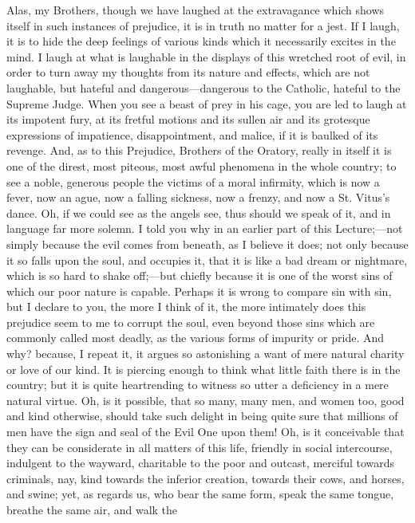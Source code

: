 Alas, my Brothers, though we have laughed at the
extravagance which shows itself in such instances of prejudice, it is in truth no matter for a jest. If I
laugh, it is to hide the deep feelings of various kinds
which it necessarily excites in the mind. I laugh at what
is laughable in the displays of this wretched root of
evil, in order to turn away my thoughts from its nature
and effects, which are not laughable, but hateful and
dangerous—dangerous to the Catholic, hateful to the
Supreme Judge. When you see a beast of prey in his cage,
you are led to laugh at its impotent fury, at its fretful
motions and its sullen air and its grotesque expressions
of impatience, disappointment, and malice, if it is
baulked of its revenge. And, as to this Prejudice,
Brothers of the Oratory, really in itself it is one of
the direst, most piteous, most awful phenomena in the
whole country; to see a noble, generous people the
victims of a moral infirmity, which is now a fever, now
an ague, now a falling sickness, now a frenzy, and now a
St. Vitus's dance. Oh, if we could see as the angels see,
thus should we speak of it, and in language far more
solemn. I told you why in an earlier part of this
Lecture;—not simply because the evil comes from
beneath, as I believe it does; not only because it so
falls upon the soul, and occupies it, that it is like a
bad dream or nightmare, which is so hard to shake
off;—but chiefly because it is one of the worst sins
of which our poor nature is capable. Perhaps it is wrong
to compare sin with sin, but I declare to you, the more I
think of it, the more intimately does this prejudice seem
to me to corrupt the soul, even beyond those sins which
are commonly called most deadly, as the various forms of
impurity or pride. And why? because, I repeat it, it
argues so astonishing a want of mere natural charity or
love of our kind. It is piercing enough to think what
little faith there is in the country; but it is quite
heartrending to witness so utter a deficiency in a mere
natural virtue. Oh, is it possible, that so many, many
men, and women too, good and kind otherwise, should take
such delight in being quite sure that millions of men
have the sign and seal of the Evil One upon them! Oh, is
it conceivable that they can be considerate in all
matters of this life, friendly in social intercourse,
indulgent to the wayward, charitable to the poor and
outcast, merciful towards criminals, nay, kind towards
the inferior creation, towards their cows, and horses,
and swine; yet, as regards us, who bear the same form,
speak the same tongue, breathe the same air, and walk the
